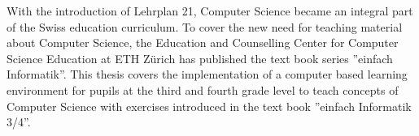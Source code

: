 With the introduction of Lehrplan 21, Computer Science became an integral part of the Swiss education curriculum. To cover the new need for teaching material about Computer Science, the Education and Counselling Center for Computer Science Education at ETH Zürich has published the text book series ''einfach Informatik''. 
This thesis covers the implementation of a computer based learning environment for pupils at the third and fourth grade level to teach concepts of Computer Science with exercises introduced in the text book ''einfach Informatik 3/4''.
